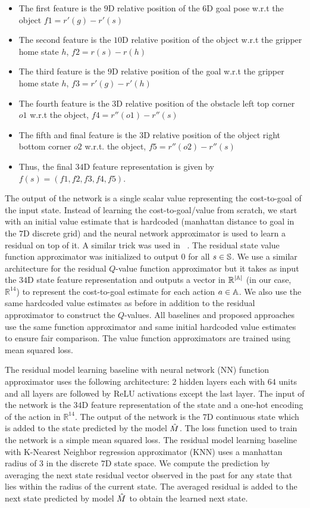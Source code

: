 \begin{itemize}
\begin{itemize}
	\end{itemize}
	\item The first feature is the $9$D relative position of the $6$D goal pose w.r.t the object $f1 = r'(g) - r'(s)$
	\item The second feature is the $10$D relative position of the object w.r.t the gripper home state $h$, $f2 = r(s) - r(h)$
	\item The third feature is the $9$D relative position of the goal w.r.t the gripper home state $h$, $f3 = r'(g) - r'(h)$
	\item The fourth feature is the $3$D relative position of the obstacle left top corner $o1$ w.r.t the object, $f4 = r''(o1) - r''(s)$
	\item The fifth and final feature is the $3$D relative position of the object right bottom corner $o2$ w.r.t. the object, $f5 = r''(o2) - r''(s)$
	\item Thus, the final $34$D feature representation is given by $f(s) = (f1, f2, f3, f4, f5)$.
\end{itemize}

The output of the network is a single scalar value representing the
cost-to-goal of the input state. Instead of learning the
cost-to-goal/value from scratch, we start with an initial value
estimate that is hardcoded (manhattan distance to goal in the $7$D
discrete grid) and the neural network approximator is used to learn a
residual on top of it. A similar trick was used in
\cmax{}~\cite{cmax}. The residual state value function
approximator was initialized to output $0$ for all $s \in
\mathbb{S}$. We use a similar architecture for the residual $Q$-value
function approximator but it takes as input the $34$D state feature
representation and outputs a vector in $\mathbb{R}^{|\mathbb{A}|}$
(in our case, $\mathbb{R}^{14}$) to represent the cost-to-goal
estimate for each action $a \in \mathbb{A}$. We also use the same
hardcoded value estimates as before in addition to the residual
approximator to construct the $Q$-values. All baselines and proposed
approaches use the same function approximator and same initial
hardcoded value estimates to ensure fair comparison. The value
function approximators are trained using mean squared loss.


The residual model learning baseline with neural network (NN) function
approximator uses the following architecture: $2$ hidden layers each
with $64$ units and all layers are followed by ReLU activations except
the last layer. The input of the network is the $34$D feature
representation of the state and a one-hot encoding of the action in
$\mathbb{R}^14$. The output of the network is the $7$D continuous
state which is added to the state predicted by the model $\hat{M}$. The
loss function used to train the network is a simple mean squared
loss. The residual model learning baseline with K-Nearest Neighbor
regression approximator (KNN) uses a manhattan radius of $3$ in the
discrete $7$D state space. We compute the prediction by averaging the
next state residual vector observed in the past for any state that
lies within the radius of the current state. The averaged residual is
added to the next state predicted by model $\hat{M}$ to obtain the
learned next state.


